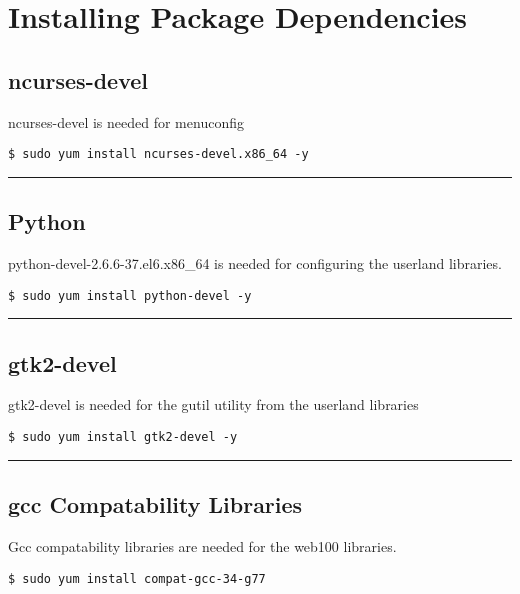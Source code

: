 \section{Installing Package Dependencies}

\subsection{ncurses-devel}
ncurses-devel is needed for menuconfig
\begin{snugshade}\begin{verbatim}
$ sudo yum install ncurses-devel.x86_64 -y
\end{verbatim}\end{snugshade}\noindent

\hrule

\subsection{Python}
python-devel-2.6.6-37.el6.x86\_64 is needed for configuring the userland libraries.
\begin{snugshade}\begin{verbatim}
$ sudo yum install python-devel -y
\end{verbatim}\end{snugshade}\noindent

\hrule

\subsection{gtk2-devel}
gtk2-devel is needed for the gutil utility from the userland libraries
\begin{snugshade}\begin{verbatim}
$ sudo yum install gtk2-devel -y
\end{verbatim}\end{snugshade}\noindent
\hrule

\subsection{gcc Compatability Libraries}
Gcc compatability libraries are needed for the web100 libraries.
\begin{snugshade}\begin{lstlisting}
$ sudo yum install compat-gcc-34-g77
\end{lstlisting}\end{snugshade}\noindent



